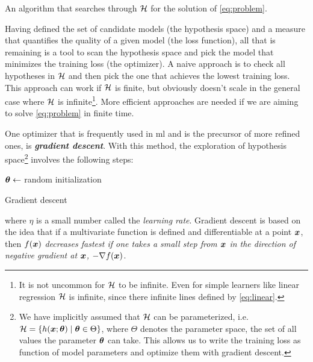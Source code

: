 \begin{definition}[Optimizer]
	An algorithm that searches through $\mathcal{H}$ for the solution of \Equation{}
	\ref{eq:problem}.
\end{definition}

Having defined the set of candidate models (the hypothesis space) and a measure
that quantifies the quality of a given model (the loss function), all that is
remaining is a tool to scan the hypothesis space and pick the model that
minimizes the training loss (the optimizer). A naive approach is to check all
hypotheses in $\mathcal{H}$ and then pick the one that achieves the lowest training
loss. This approach can work if $\mathcal{H}$ is finite, but obviously doesn't scale
in the general case where $\mathcal{H}$ is infinite\footnote{It is not
uncommon for $\mathcal{H}$ to be infinite. Even for simple learners like linear
regression $\mathcal{H}$ is infinite, since there infinite lines defined by \Equation{}
\ref{eq:linear}.}. More efficient approaches are needed if we are aiming to solve
\Equation{} \ref{eq:problem} in finite time.

One optimizer that is frequently used in \gls{ml} and is the precursor of more
refined ones, is \emph{\textbf{gradient descent}}. With
this method, the exploration of hypothesis space\footnote{We have implicitly
assumed that $\mathcal{H}$ can be parameterized, i.e. $\mathcal{H} = \{h(\boldsymbol{x};\boldsymbol{\theta})
\mid \boldsymbol{\theta} \in \Theta\}$, where $\Theta$ denotes the parameter space, the set of
all values the parameter $\boldsymbol{\theta}$ can take. This allows us to write the training
loss as function of model parameters and optimize them with gradient descent.}
involves the following steps:

\begin{algorithm}[H]
	$\boldsymbol{\theta} \gets$ random initialization\;
	\caption{Gradient descent}
	\label{algo:gd}
\end{algorithm}

\noindent where $\eta$ is a small number called the \emph{learning
rate}. Gradient descent is based on the idea that
if a multivariate function is defined and differentiable at a point $\boldsymbol{x}$, then
$f(\boldsymbol{x})$ \emph{decreases fastest if one takes a small step from $\boldsymbol{x}$ in the
direction of negative gradient at $\boldsymbol{x}$, $-\nabla f(\boldsymbol{x})$}.

